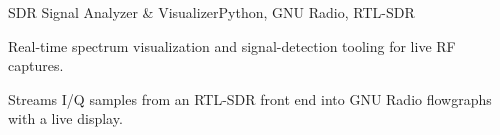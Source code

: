 \begin{cvproject}{SDR Signal Analyzer \& Visualizer}{Python, GNU Radio, RTL-SDR}
  \item Real-time spectrum visualization and signal-detection tooling for live RF captures.
  \item Streams I/Q samples from an RTL-SDR front end into GNU Radio flowgraphs with a live display.
\end{cvproject}
